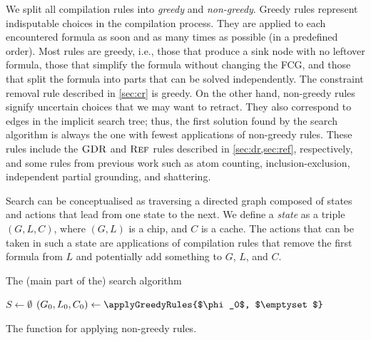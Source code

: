 We split all compilation rules into \emph{greedy} and \emph{non-greedy}. Greedy
rules represent indisputable choices in the compilation process. They are
applied to each encountered formula as soon and as many times as possible (in a
predefined order). Most rules are greedy, i.e., those that produce a sink node
with no leftover formula, those that simplify the formula without changing the
FCG, and those that split the formula into parts that can be solved
independently. The constraint removal rule described in \cref{sec:cr} is greedy.
On the other hand, non-greedy rules signify uncertain choices that we may want
to retract. They also correspond to edges in the implicit search tree; thus, the
first solution found by the search algorithm is always the one with fewest
applications of non-greedy rules. These rules include the $\operatorname{\textsc{GDR}}$ and $\operatorname{\textsc{Ref}}$
rules described in \cref{sec:dr,sec:ref}, respectively, and some rules from
previous work \citep{DBLP:conf/ijcai/BroeckTMDR11} such as atom counting,
inclusion-exclusion, independent partial grounding, and shattering.

Search can be conceptualised as traversing a directed graph composed of states
and actions that lead from one state to the next. We define a \emph{state} as a
triple $(G, L, C)$, where $(G, L)$ is a chip, and $C$ is a cache. The actions
that can be taken in such a state are applications of compilation rules that
remove the first formula from $L$ and potentially add something to $G$, $L$, and
$C$.

\begin{algorithm}
  \caption{The (main part of the) search algorithm}\label{alg:search}
   $S \gets \emptyset$\;
  $(G_0, L_0, C_{0}) \gets \applyGreedyRules{$\phi_0$, $\emptyset$}$\;\label{line:greedy}
\end{algorithm}

\begin{algorithm}
  \caption{The function for applying non-greedy rules.}\label{alg:applyallrules}
\end{algorithm}


